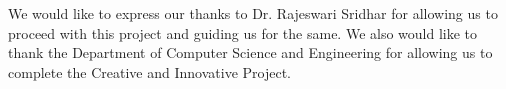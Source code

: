   We would like to express our thanks to Dr. Rajeswari Sridhar for allowing us to proceed with this project and guiding us for the same. We also would like to thank the Department of Computer Science and Engineering for allowing us to complete the Creative and Innovative Project.
